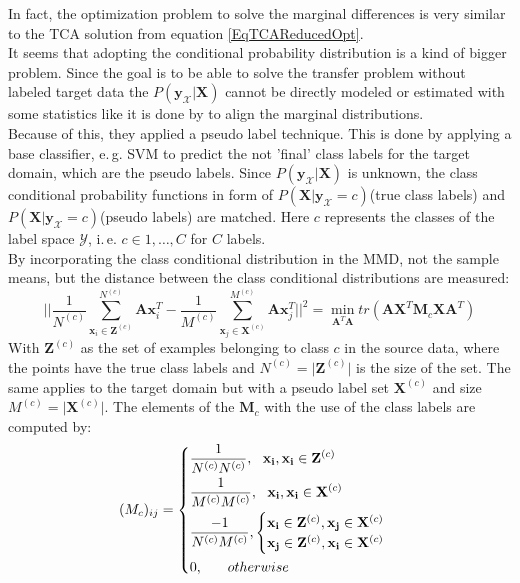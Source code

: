 In fact, the optimization problem to solve the marginal differences is very similar to the \acs{TCA} solution from equation \eqref{EqTCAReducedOpt}.\cite{Pan.2011}\\
It seems that adopting the conditional probability distribution is a kind of bigger problem.
Since the goal is to be able to solve the transfer problem without labeled target data the $P(\mathbf{y}_\mathcal{X}\vert \mathbf{X})$ cannot be directly modeled or estimated with some statistics like it is done by to align the marginal distributions.\cite{Long.}\\
Because of this, they applied a pseudo label technique.
This is done by applying a base classifier, e.\,g. \acs{SVM} to predict the not 'final' class labels for the target domain, which are the pseudo labels.
Since $P(\mathbf{y}_\mathcal{X}\vert \mathbf{X})$ is unknown, the class conditional probability functions in form of $P(\mathbf{X}\vert \mathbf{y}_\mathcal{X}=c)$(true class labels) and $P(\mathbf{X}\vert \mathbf{y}_\mathcal{X}=c)$(pseudo labels) are matched.
Here $c$ represents the classes of the label space $\mathcal{Y}$, i.\,e. $c\in{1,\dots,C}$ for $C$ labels.\cite{Long.}\\
By incorporating the class conditional distribution in the \acl{MMD}, not the sample means, but the distance between the class conditional distributions are measured:\cite{Long.}
\begin{equation}\label{EqJDAConditionalOpt}
\bigg|\bigg| \frac{1}{N^{(c)}} \sum_{\mathbf{x}_i \in \mathbf{Z}^{(c)}}^{N^{(c)}}\mathbf{A}\mathbf{x}_i^T- \frac{1}{M^{(c)}} \sum_{\mathbf{x}_j \in \mathbf{X}^{(c)}}^{M^{(c)}}\mathbf{A}\mathbf{x}_j^T \bigg|\bigg|^2 = \min_{\mathbf{A}^T\mathbf{A}} tr(\mathbf{A}\mathbf{X}^T\mathbf{M}_c\mathbf{X}\mathbf{A}^T)
\end{equation}
With  $\mathbf{Z}^{(c)}$ as the set of examples belonging to class $c$ in the source data, where the points have the true class labels and $N^{(c)} = \vert\mathbf{Z}^{(c)}\vert$ is the size of the set.
The same applies to the target domain but with a pseudo label set $\mathbf{X}^{(c)}$ and size $M^{(c)} = \vert\mathbf{X}^{(c)}\vert$.
The elements of the $\mathbf{M}_c$ with the use of the class labels are computed by: \cite{Long.}
\begin{equation}\label{EqJDAMMDPseudoMatrix}
(M_c)_{ij}= \begin{dcases}
\frac{1}{N^{(c)} N^{(c)} },\>\>\> \mathbf{x_i},\mathbf{x_i} \in \mathbf{Z}^{(c)} \\
\frac{1}{M^{(c)}  M^{(c)}  },\>\>\> \mathbf{x_i},\mathbf{x_i} \in \mathbf{X}^{(c)} \\
\frac{-1}{N ^{(c)} M ^{(c)} }, \begin{cases}
\mathbf{x_i} \in \mathbf{Z}^{(c)}, \mathbf{x_j} \in \mathbf{X}^{(c)}\\
\mathbf{x_j} \in \mathbf{Z}^{(c)}, \mathbf{x_i} \in \mathbf{X}^{(c)}\\
\end{cases}\\
0,\>\>\>\>\>\>\>\> otherwise
\end{dcases}
\end{equation}
